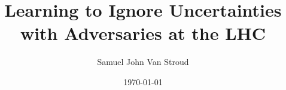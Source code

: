 \documentclass[draft]{uclthesis} %
\title{Learning to Ignore Uncertainties with Adversaries at the LHC}
\author{Samuel John Van Stroud\xspace}
\date{\today}
\begin{document}
\begin{frontmatter}
  
\end{frontmatter}

\begin{mainmatter}
  
  
  
\end{mainmatter}

\begin{appendices}
  
\end{appendices}

\begin{backmatter}
  
\end{backmatter}

\end{document}
